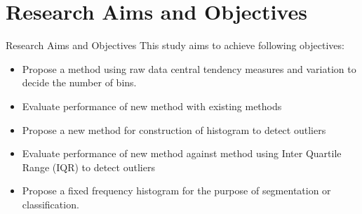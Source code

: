 \documentclass{beamer}
\begin{document}
\section{Research Aims and Objectives}
\begin{frame}{Research Aims and Objectives}
This study aims to achieve following objectives:

\begin{itemize}
	\item Propose a method using raw data central tendency measures  and variation to decide the number of bins.
	\item Evaluate performance of new method with existing methods
	\item Propose a new method for construction of histogram to detect outliers
	\item Evaluate performance of new method against method using Inter Quartile Range (IQR) to detect outliers
	\item Propose a fixed frequency histogram for the purpose of segmentation or classification.
	
\end{itemize}
\end{frame}
\end{document}
